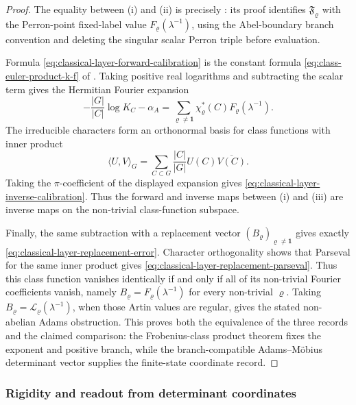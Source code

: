 \documentclass[11pt,a4paper]{amsart}
\theoremstyle{plain}
\theoremstyle{definition}
\theoremstyle{remark}
\begin{document}
\begin{proof}
  The equality between \textup{(i)} and \textup{(ii)} is precisely
  : its proof identifies
  \(\mathfrak F_\varrho\) with the Perron-point fixed-label value
  \(F_\varrho(\lambda^{-1})\), using the Abel-boundary branch convention and
  deleting the singular scalar Perron triple before evaluation.

  Formula \eqref{eq:classical-layer-forward-calibration} is the constant
  formula \eqref{eq:class-euler-product-k-f} of
  .  Taking positive real logarithms and
  subtracting the scalar term gives the Hermitian Fourier expansion
  \[
    -\frac{|G|}{|C|}\log K_C-\alpha_A
    =
    \sum_{\varrho\neq\mathbf1}
      \chi_\varrho^\ast(C)F_\varrho(\lambda^{-1}).
  \]
  The irreducible characters form an orthonormal basis for class functions with
  inner product
  \[
    \langle U,V\rangle_G
    =\sum_{C\subset G}\frac{|C|}{|G|}U(C)\overline{V(C)}.
  \]
  Taking the \(\pi\)-coefficient of the displayed expansion gives
  \eqref{eq:classical-layer-inverse-calibration}.  Thus the forward and inverse
  maps between \textup{(i)} and \textup{(iii)} are inverse maps on the
  non-trivial class-function subspace.

  Finally, the same subtraction with a replacement vector
  \((B_\varrho)_{\varrho\neq\mathbf1}\) gives exactly
  \eqref{eq:classical-layer-replacement-error}.  Character orthogonality shows
  that Parseval for the same inner product gives
  \eqref{eq:classical-layer-replacement-parseval}.  Thus this class function
  vanishes identically if and only if all of its non-trivial Fourier
  coefficients vanish, namely
  \(B_\varrho=F_\varrho(\lambda^{-1})\) for every non-trivial
  \(\varrho\).  Taking
  \(B_\varrho=\mathcal L_\varrho(\lambda^{-1})\), when those Artin values are
  regular, gives the stated non-abelian Adams obstruction.  This proves both
  the equivalence of the three records and the claimed comparison: the
  Frobenius-class product theorem fixes the exponent and positive branch, while
  the branch-compatible Adams--M\"obius determinant vector supplies the
  finite-state coordinate record.
\end{proof}
\subsubsection{Rigidity and readout from determinant coordinates}
\end{document}
